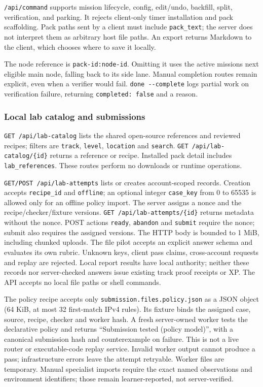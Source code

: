 \texttt{/api/command} supports mission lifecycle, config, edit/undo,
backfill, split, verification, and parking. It rejects client-only timer
installation and pack scaffolding. Pack paths sent by a client must
include \texttt{pack\_text}; the server does not interpret them as
arbitrary host file paths. An export returns Markdown to the client,
which chooses where to save it locally.

The node reference is \texttt{pack-id:node-id}. Omitting it uses the
active mission\textquotesingle s next eligible main node, falling back
to its side lane. Manual completion routes remain explicit, even when a
verifier would fail. \texttt{done -\/-complete} logs partial work on
verification failure, returning \texttt{completed: false} and a reason.


\subsubsection{Local lab catalog and submissions}
\texttt{GET /api/lab-catalog} lists the shared open-source references and reviewed
recipes; filters are \texttt{track}, \texttt{level}, \texttt{location} and
\texttt{search}. \texttt{GET /api/lab-catalog/\{id\}} returns a reference or recipe.
Installed pack detail includes \texttt{lab\_references}. These routes perform no
downloads or runtime operations.

\texttt{GET/POST /api/lab-attempts} lists or creates account-scoped records.
Creation accepts \texttt{recipe\_id} and \texttt{offline}; an optional integer
\texttt{case\_key} from 0 to 65535 is allowed only for an offline policy import.
The server assigns a
nonce and the recipe/checker/fixture versions. \texttt{GET /api/lab-attempts/\{id\}}
returns metadata without the nonce. POST actions \texttt{ready}, \texttt{abandon}
and \texttt{submit} require the nonce; submit also requires the assigned versions.
The HTTP body is bounded to 1 MiB, including chunked uploads. The file pilot accepts
an explicit answer schema and evaluates its own rubric. Unknown keys, client pass
claims, cross-account requests and replay are rejected. Local report results have
local authority; neither these records nor server-checked answers issue existing
track proof receipts or XP. The API accepts no local file paths or shell commands.

The policy recipe accepts only \texttt{submission.files.policy.json} as a JSON
object (64 KiB, at most 32 first-match IPv4 rules). Its fixture binds the assigned
case, source, recipe, checker and worker hash. A fresh server-owned worker tests
the declarative policy and returns ``Submission tested (policy model)'', with a
canonical submission hash and counterexample on failure. This is not a live
router or executable-code replay service. Invalid worker output cannot produce a
pass; infrastructure errors leave the attempt retryable. Worker files are
temporary. Manual specialist imports require the exact named observations and
environment identifiers; those remain learner-reported, not server-verified.

